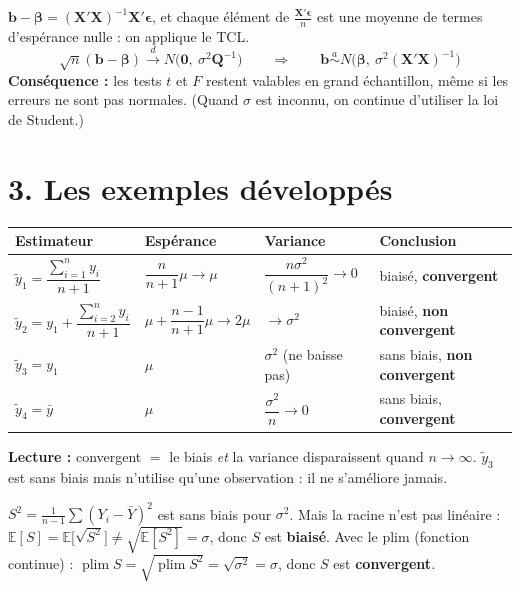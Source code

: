 \documentclass[12pt,a4paper]{article}
\newcommand{\vX}{\mathbf{X}}\newcommand{\vb}{\mathbf{b}}\newcommand{\vx}{\mathbf{x}}
\newcommand{\vbeta}{\bm{\beta}}\newcommand{\veps}{\bm{\epsilon}}\newcommand{\Q}{\mathbf{Q}}\newcommand{\I}{\mathbf{I}}
\newcommand{\E}{\mathbb{E}}\newcommand{\Var}{\operatorname{Var}}\newcommand{\plim}{\operatorname{plim}}
\begin{document}
\begin{outil}[title={Loi asymptotique des MCO (sans supposer la normalité)}]
$\vb-\vbeta=(\vX'\vX)^{-1}\vX'\veps$, et chaque élément de $\frac{\vX'\veps}{n}$ est une moyenne de termes d'espérance nulle : on applique le TCL.
\[
\sqrt n(\vb-\vbeta)\xrightarrow{d}N\big(\mathbf 0,\ \sigma^2\Q^{-1}\big)
\qquad\Longrightarrow\qquad
\vb\overset{a}{\sim}N\big(\vbeta,\ \sigma^2(\vX'\vX)^{-1}\big)
\]
\textbf{Conséquence :} les tests $t$ et $F$ restent valables en grand échantillon, même si les erreurs ne sont pas normales. (Quand $\sigma$ est inconnu, on continue d'utiliser la loi de Student.)
\end{outil}

\section*{3. Les exemples développés}

\begin{dev}[title={Les 4 cas : biaisé ou non, convergent ou non ($Y_i$ i.i.d.$(\mu,\sigma^2)$)}]
\small\renewcommand{\arraystretch}{1.5}
\begin{tabular}{@{}llll@{}}
\toprule
Estimateur & Espérance & Variance & Conclusion \\
\midrule
$\tilde y_1=\dfrac{\sum_{i=1}^n y_i}{n+1}$ & $\dfrac{n}{n+1}\mu\to\mu$ & $\dfrac{n\sigma^2}{(n+1)^2}\to0$ & biaisé, \textbf{convergent} \\
$\tilde y_2=y_1+\dfrac{\sum_{i=2}^n y_i}{n+1}$ & $\mu+\dfrac{n-1}{n+1}\mu\to2\mu$ & $\to\sigma^2$ & biaisé, \textbf{non convergent} \\
$\tilde y_3=y_1$ & $\mu$ & $\sigma^2$ (ne baisse pas) & sans biais, \textbf{non convergent} \\
$\tilde y_4=\bar y$ & $\mu$ & $\dfrac{\sigma^2}{n}\to0$ & sans biais, \textbf{convergent} \\
\bottomrule
\end{tabular}

\textbf{Lecture :} convergent $=$ le biais \emph{et} la variance disparaissent quand $n\to\infty$. $\tilde y_3$ est sans biais mais n'utilise qu'une observation : il ne s'améliore jamais.
\end{dev}

\begin{dev}[title={Estimer $\sigma$ : $S$ est biaisé mais convergent}]
$S^2=\frac1{n-1}\sum(Y_i-\bar Y)^2$ est sans biais pour $\sigma^2$. Mais la racine n'est pas linéaire :
$\E[S]=\E\big[\sqrt{S^2}\big]\neq\sqrt{\E[S^2]}=\sigma$, donc $S$ est \textbf{biaisé}.
Avec le plim (fonction continue) : $\plim S=\sqrt{\plim S^2}=\sqrt{\sigma^2}=\sigma$, donc $S$ est \textbf{convergent}.
\end{dev}
\end{document}
